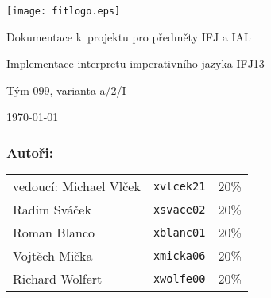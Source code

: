 \documentclass[12pt,a4paper,titlepage,final]{article}
\begin{document}

  \begin{titlepage}

    \centering
    \texttt{[image: fitlogo.eps]}

    \vfill

    \begin{center}
      \begin{Large}
        Dokumentace k~projektu pro předměty IFJ a IAL \\
      \end{Large}
      \bigskip
      \begin{LARGE}
        Implementace interpretu imperativního jazyka IFJ13 \\[1cm]
      \end{LARGE}
      \begin{large}
        Tým 099, varianta a/2/I
      \end{large}
    \end{center}

    \vfill

    \begin{center}
      \begin{Large}
        \today
      \end{Large}
    \end{center}

    \vfill

    \begin{flushleft}
      \subsubsection*{Autoři:}
        \begin{tabular}{llr}
          vedoucí: Michael Vlček & \texttt{xvlcek21} & 20\% \\
          Radim Sváček           & \texttt{xsvace02} & 20\% \\
          Roman Blanco           & \texttt{xblanc01} & 20\% \\
          Vojtěch Mička          & \texttt{xmicka06} & 20\% \\
          Richard Wolfert        & \texttt{xwolfe00} & 20\% \\
        \end{tabular}
    \end{flushleft}

  \end{titlepage}\setlength{\parindent}{1cm}
\end{document}
